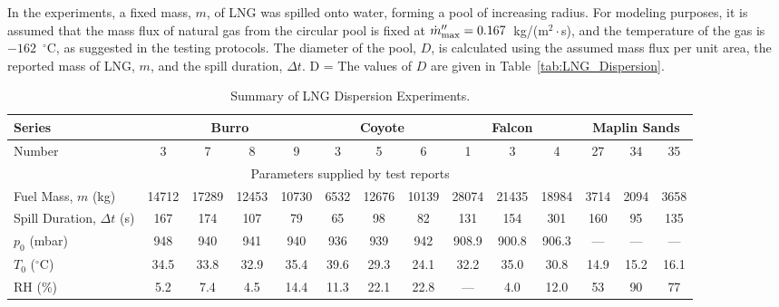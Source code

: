In the experiments, a fixed mass, $m$, of LNG was spilled onto water, forming a pool of increasing radius. For modeling purposes, it is assumed that the mass flux of natural gas from the circular pool is fixed at $\dot{m}''_{\rm max}=0.167$~kg/(m$^2 \cdot$s), and the temperature of the gas is $-162$~$^\circ$C, as suggested in the testing protocols. The diameter of the pool, $D$, is calculated using the assumed mass flux per unit area, the reported mass of LNG, $m$, and the spill duration, $\Delta t$.
\be
   D = 
\ee
The values of $D$ are given in Table~\ref{tab:LNG_Dispersion}.

\begin{table}
\caption[Summary of LNG Dispersion Experiments]{Summary of LNG Dispersion Experiments.}
\begin{center}
\begin{tabular}{|l|c|c|c|c|c|c|c|c|c|c|c|c|c|}
\hline
Series                         & \multicolumn{4}{|c|}{Burro}       & \multicolumn{3}{|c|}{Coyote}  & \multicolumn{3}{|c|}{Falcon}                  & \multicolumn{3}{|c|}{Maplin Sands}          \\ \hline
Number                         & 3      & 7      & 8      & 9      &  3     & 5      & 6           &  1          & 3           & 4                 &  27             & 34             & 35      \\ \hline \hline
\multicolumn{14}{|c|}{Parameters supplied by test reports} \\ \hline
Fuel Mass, $m$ (kg)            & 14712  & 17289  & 12453  & 10730  & 6532   & 12676  & 10139       & 28074       & 21435       & 18984             & 3714            & 2094           & 3658    \\ \hline
Spill Duration, $\Delta t$ (s) & 167    & 174    & 107    & 79     & 65     & 98     & 82          & 131         & 154         & 301               & 160             & 95             & 135     \\ \hline
$p_0$ (mbar)                   & 948    & 940    & 941    & 940    & 936    & 939    & 942         & 908.9       & 900.8       & 906.3             & ---             & ---            & ---     \\ \hline
$T_0$ ($^\circ$C)              & 34.5   & 33.8   & 32.9   & 35.4   & 39.6   & 29.3   & 24.1        & 32.2        & 35.0        & 30.8              & 14.9            & 15.2           & 16.1    \\ \hline
RH (\%)                        & 5.2    & 7.4    & 4.5    & 14.4   & 11.3   & 22.1   & 22.8        & ---         & 4.0         & 12.0              & 53              & 90             & 77      \\ \hline

\end{tabular}
\end{center}
\end{table}
